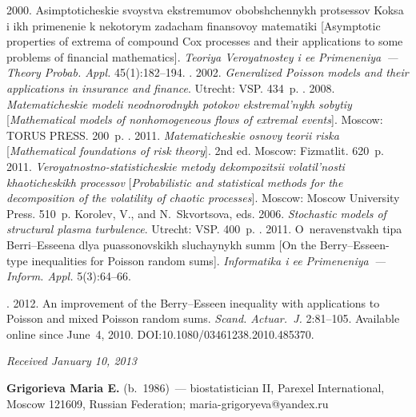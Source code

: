 \begin{multicols}{2}
{{\begin{thebibliography}{99}
 2000. 
Asimptoticheskie svoystva ekstremumov obobshchennykh protsessov Koksa 
i ikh primenenie k nekotorym zadacham finansovoy matematiki 
[Asymptotic properties of extrema of compound Cox processes and 
their applications to some problems of financial mathematics]. 
\textit{Teoriya Veroyatnostey i ee Primeneniya~--- Theory Probab. Appl.} 45(1):182--194.
.  2002.
\textit{Generalized Poisson models and their applications in insurance and finance}. 
Utrecht: VSP. 434~p.
. 2008. 
\textit{Matema\-ti\-che\-skie modeli neodnorodnykh potokov ekstremal'nykh sobytiy} 
[\textit{Mathematical models of nonhomogeneous flows of extremal events}]. Moscow: TORUS PRESS.
200~p.
. 
2011. \textit{Ma\-te\-ma\-ti\-che\-skie osnovy teorii riska} 
[\textit{Mathematical foundations of risk theory}]. 2nd ed. Moscow: Fizmatlit. 620~p.
 2011. 
\textit{Veroyatnostno-statisticheskie metody dekompozitsii volatil'nosti khaoticheskikh processov} 
[\textit{Probabilistic and statistical methods for the decomposition of the volatility of chaotic 
processes}]. Moscow: Moscow University Press. 510~p.
Korolev, V., and N.~Skvortsova, eds.  2006.
\textit{Stochastic models of structural plasma turbulence}. Utrecht: VSP. 400~p.
. 2011. 
O~neravenstvakh tipa Berri--Esseena dlya puassonovskikh sluchaynykh summ 
[On the Berry--Esseen-type inequalities for Poisson random sums]. 
\textit{Informatika i ee Primeneniya~--- Inform. Appl.} 5(3):64--66.


 
.  2012.
An improvement of the Berry--Esseen inequality with applications to Poisson and 
mixed Poisson random sums. \textit{Scand. Actuar.~J.} 2:81--105.
Available online since June~4, 2010.
{\sf DOI:10.1080/03461238.2010.485370}.
\end{thebibliography}
} }



\end{multicols}

\hfill{\small\textit{Received January 10, 2013}}

\Contr

\noindent
\textbf{Grigorieva Maria E.} (b.\ 1986)~--- biostatistician II, 
Parexel International, Moscow 121609, Russian Federation; maria-grigoryeva@yandex.ru

